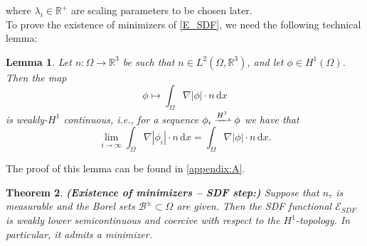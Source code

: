\documentclass[12pt,openany]{book}
\newcommand{\R}{\mathbb{R}}
\theoremstyle{plainnormal}
\newtheorem{theorem}{Theorem}[section]
\newtheorem{lemma}[theorem]{Lemma}
\theoremstyle{remark}
\begin{document}
where $\lambda_i\in\R^+$ are scaling parameters to be chosen later.\\
To prove the existence of minimizers of \eqref{E_SDF}, we need the following technical lemma: 
\begin{lemma}\label{technicalLemma}
    Let $n: \Omega \rightarrow \R^3$ be such that $n\in L^2(\Omega, \R^3)$, and let $\phi\in H^1(\Omega)$. Then the map $$\phi \mapsto \int_\Omega \nabla |\phi|\cdot n \,\mathrm{d}x$$ is weakly-$H^1$ continuous, i.e., for a sequence $\phi_i \xrightharpoonup{H^1}\phi$ we have that $$\lim_{i\rightarrow\infty}\int_\Omega \nabla|\phi_i|\cdot n  \,\mathrm{d}x = \int_\Omega \nabla|\phi|\cdot n\,\mathrm{d}x.$$
\end{lemma}
The proof of this lemma can be found in \cref{appendix:A}.
\begin{theorem}\label{ProofExSDF}\textbf{(Existence of minimizers -- SDF step:)} 
Suppose that $n_\tau$ is measurable and the Borel sets $\mathcal{B}^{\pm}\subset \Omega$ are given. Then the SDF functional $\mathcal{E}_{SDF}$ is weakly lower semicontinuous and coercive with respect to the $H^1$-topology. In particular, it admits a minimizer.
\end{theorem}
\end{document}
